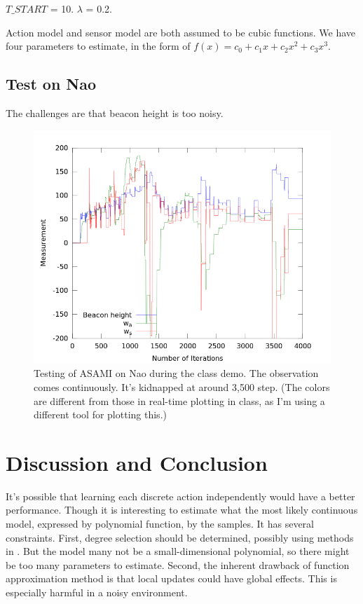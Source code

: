 \documentclass[10pt]{article}
\begin{document}
$T\_START$ = 10. $\lambda$ = 0.2. 

Action model and sensor model are both assumed to be cubic functions.
We have four parameters to estimate, in the form of $f(x) = c_0 + c_1
x + c_2 x^2 + c_3 x^3$.

\subsection{Test on Nao}

The challenges are that beacon height is too noisy.

\begin{figure}
\centering
\includegraphics[width=0.8\columnwidth]{demoResult.png}
\caption{Testing of ASAMI on Nao during the class demo. The
observation comes continuously. It's kidnapped at around 3,500 step.
(The colors are different from those in real-time plotting in class,
as I'm using a different tool for plotting this.)}
\label{fig:fuelworld}
\end{figure}


\section{Discussion and Conclusion}

It's possible that learning each discrete action independently would
have a better performance. Though it is interesting to estimate what
the most likely continuous model, expressed by polynomial function, by
the samples. It has several constraints. First, degree selection
should be determined, possibly using methods in
\cite{IJAIT08-stronger}. But the model many not be a small-dimensional
polynomial, so there might be too many parameters to estimate. Second,
the inherent drawback of function approximation method is that local
updates could have global effects. This is especially harmful in a
noisy environment.




\end{document}
